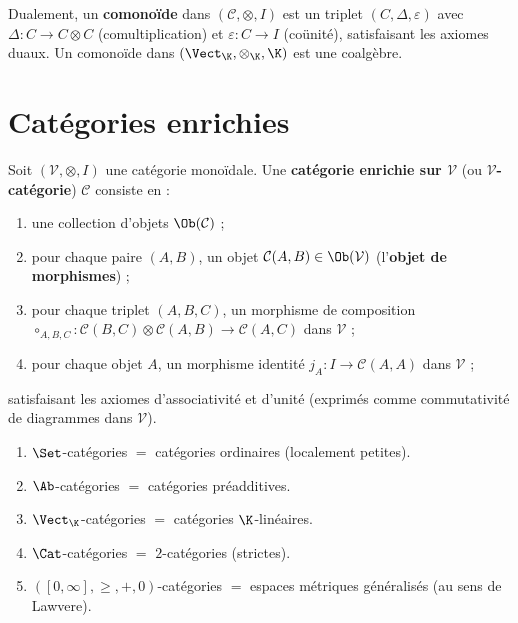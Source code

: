\begin{definition}[Comonoïde]\label{def:comonoide}
Dualement, un \textbf{comonoïde} dans $(\mathcal{C}, \otimes, I)$
est un triplet $(C, \Delta, \varepsilon)$ avec
$\Delta \colon C \to C \otimes C$ (comultiplication) et
$\varepsilon \colon C \to I$ (coünité), satisfaisant les axiomes duaux.
Un comonoïde dans $(\Vect_\K, \otimes_\K, \K)$ est une coalgèbre.
\end{definition}

\section{Catégories enrichies}\label{sec:categories-enrichies}

\begin{definition}\label{def:cat-enrichie}
Soit $(\mathcal{V}, \otimes, I)$ une catégorie monoïdale.
Une \textbf{catégorie enrichie sur $\mathcal{V}$} (ou
\textbf{$\mathcal{V}$-catégorie}) $\mathcal{C}$ consiste en :
\begin{enumerate}[label=(\roman*)]
\item une collection d'objets $\Ob(\mathcal{C})$ ;
\item pour chaque paire $(A, B)$, un objet
      $\mathcal{C}(A,B) \in \Ob(\mathcal{V})$
      (l'\textbf{objet de morphismes}) ;
\item pour chaque triplet $(A, B, C)$, un morphisme de composition
      $\circ_{A,B,C} \colon \mathcal{C}(B,C) \otimes \mathcal{C}(A,B)
      \to \mathcal{C}(A,C)$ dans $\mathcal{V}$ ;
\item pour chaque objet $A$, un morphisme identité
      $j_A \colon I \to \mathcal{C}(A,A)$ dans $\mathcal{V}$ ;
\end{enumerate}
satisfaisant les axiomes d'associativité et d'unité
(exprimés comme commutativité de diagrammes dans $\mathcal{V}$).
\end{definition}

\begin{exemple}\label{ex:enrichissements}
\begin{enumerate}[label=(\roman*)]
\item $\Set$-catégories $=$ catégories ordinaires
      (localement petites).
\item $\Ab$-catégories $=$ catégories préadditives.
\item $\Vect_\K$-catégories $=$ catégories $\K$-linéaires.
\item $\Cat$-catégories $=$ $2$-catégories (strictes).
\item $([0,\infty], \geq, +, 0)$-catégories $=$ espaces métriques
      généralisés (au sens de Lawvere).
\end{enumerate}
\end{exemple}

